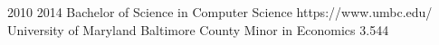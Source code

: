\schoolgroup
    {2010} {2014}
    {Bachelor of Science in Computer Science} {https://www.umbc.edu/} {University of Maryland Baltimore County}
    {Minor in Economics}
    {3.544}



